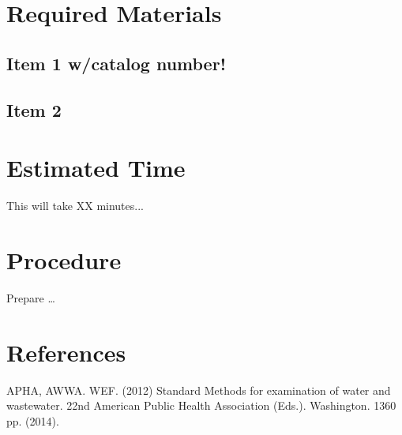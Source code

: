 \documentclass[12pt]{../SOP2}
\begin{document}
\section{Required Materials}

\subsection{Item 1 w/catalog number!}
\subsection{Item 2}

\section{Estimated Time}

\NP This will take XX minutes...

\section{Procedure}

\NP Prepare \dots

\NP

\section{References}

\NP APHA, AWWA. WEF. (2012) Standard Methods for examination of water and wastewater. 22nd American Public Health Association (Eds.). Washington. 1360 pp. (2014).
\end{document}
